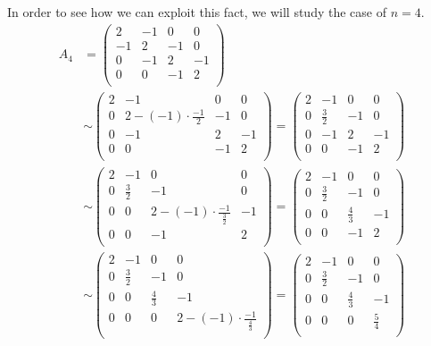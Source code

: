 \documentclass[a4paper]{article}
\begin{document}
In order to see how we can exploit this fact, we will study the case of $n=4$.
\begin{align*}
A_4 &= \left(\begin{array}{ccccc}
   2 & -1 &  0 &  0 \\
  -1 &  2 & -1 &  0 \\
   0 & -1 &  2 & -1 \\
   0 &  0 & -1 &  2 \\
\end{array} \right)\\
&\sim
\left(\begin{array}{ccccc}
   2 & -1 &  0 &  0 \\
  0 &  2 - (-1)\cdot\frac{-1}{2} & -1 &  0 \\
   0 & -1 &  2 & -1 \\
   0 &  0 & -1 &  2 \\
\end{array} \right)
=
\left(\begin{array}{ccccc}
   2 & -1 &  0 &  0 \\
  0 &  \frac{3}{2} & -1 &  0 \\
   0 & -1 &  2 & -1 \\
   0 &  0 & -1 &  2 \\
\end{array} \right)\\
&\sim
\left(\begin{array}{ccccc}
   2 & -1 &  0 &  0 \\
  0 &  \frac{3}{2} & -1 &  0 \\
   0 &  0 &  2 - (-1)\cdot\frac{-1}{\frac{3}{2}} & -1 \\
   0 &  0 & -1 &  2 \\
\end{array} \right)
=
\left(\begin{array}{ccccc}
   2 & -1 &  0 &  0 \\
  0 &  \frac{3}{2} & -1 &  0 \\
   0 &  0 &  \frac{4}{3} & -1 \\
   0 &  0 & -1 &  2 \\
\end{array} \right) \\
&\sim
\left(\begin{array}{ccccc}
   2 & -1 &  0 &  0 \\
  0 &  \frac{3}{2} & -1 &  0 \\
   0 &  0 &  \frac{4}{3} & -1 \\
   0 &  0 &  0 &  2 - (-1)\cdot\frac{-1}{\frac{4}{3}} \\
\end{array} \right)
=
\left(\begin{array}{ccccc}
   2 & -1 &  0 &  0 \\
  0 &  \frac{3}{2} & -1 &  0 \\
   0 &  0 &  \frac{4}{3} & -1 \\
   0 &  0 &  0 & \frac{5}{4} \\
\end{array} \right) \\
\end{align*}
\end{document}

